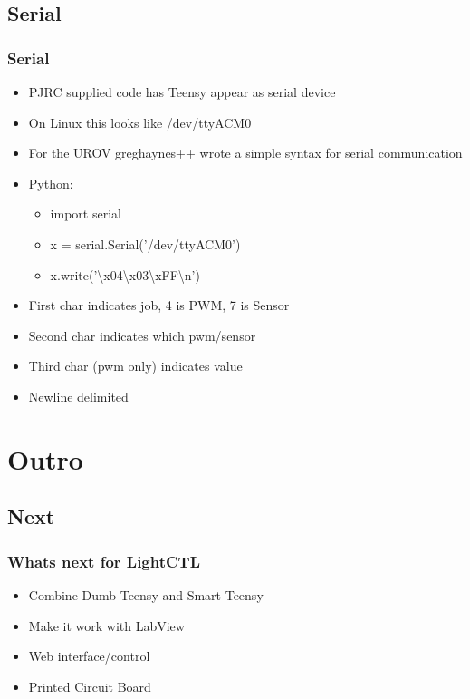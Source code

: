 \documentclass{beamer}
\begin{document}
\subsection{Serial}
\frame
{
	\frametitle{Serial}
	\begin{itemize}
		\item PJRC supplied code has Teensy appear as serial device
		\item On Linux this looks like /dev/ttyACM0
		\item For the UROV greghaynes++ wrote a simple syntax for serial communication
		\item Python:
		\begin{itemize}
			\item import serial
			\item x = serial.Serial('/dev/ttyACM0')
			\item x.write('\textbackslash x04\textbackslash x03\textbackslash xFF\textbackslash n')
		\end{itemize}
		\item First char indicates job, 4 is PWM, 7 is Sensor
		\item Second char indicates which pwm/sensor
		\item Third char (pwm only) indicates value
		\item Newline delimited
	\end{itemize}
}
\section{Outro}
\subsection{Next}
\frame
{
	\frametitle{Whats next for LightCTL}
	\begin{itemize}
		\item Combine Dumb Teensy and Smart Teensy
		\item Make it work with LabView
		\item Web interface/control
		\item Printed Circuit Board
	\end{itemize}
}


\end{document}
